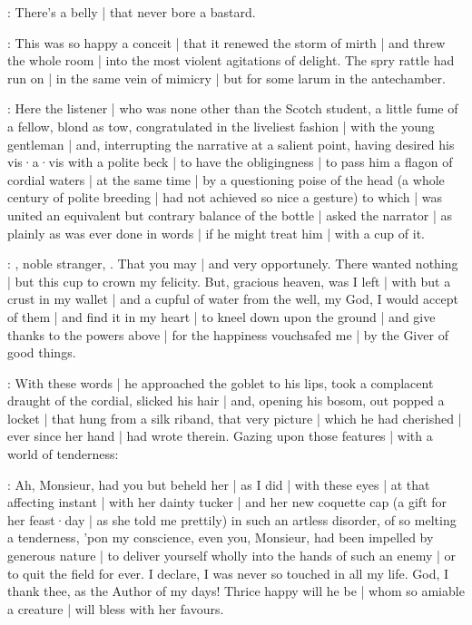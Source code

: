 \mulligan:
There's a belly |
that never bore a bastard.

:
This was so happy a conceit |
that it renewed the storm of mirth |
and threw the whole room |
into the most violent agitations of delight.
The spry rattle had run on |
in the same vein of mimicry |
but for some larum in the antechamber.

\pagebreak[4]


:
Here the listener |
who was none other than the Scotch student,
a little fume of a fellow,
blond as tow,
congratulated in the liveliest fashion |
with the young gentleman |
and,
interrupting the narrative at a salient point,
having desired his vis·a·vis with a polite beck |
to have the obligingness |
to pass him a flagon of cordial waters |
at the same time |
by a questioning poise of the head
(a whole century of polite breeding |
had not achieved so nice a gesture)
to which |
was united an equivalent but contrary balance of the bottle |
asked the narrator |
as plainly as was ever done in words |
if he might treat him |
with a cup of it.

\bannon:
,
noble stranger,
.
That you may |
and very opportunely.
There wanted nothing |
but this cup to crown my felicity.
But,
gracious heaven,
was I left |
with but a crust in my wallet |
and a cupful of water from the well,
my God,
I would accept of them |
and find it in my heart |
to kneel down upon the ground |
and give thanks to the powers above |
for the happiness vouchsafed me |
by the Giver of good things.

:
With these words |
he approached the goblet to his lips,
took a complacent draught of the cordial,
slicked his hair |
and,
opening his bosom,
out popped a locket |
that hung from a silk riband,
that very picture |
which he had cherished |
ever since her hand |
had wrote therein.
Gazing upon those features |
with a world of tenderness:

\bannon:
Ah,
Monsieur,
had you but beheld her |
as I did |
with these eyes |
at that affecting instant |
with her dainty tucker |
and her new coquette cap
(a gift for her feast·day |
as she told me prettily)
in such an artless disorder,
of so melting a tenderness,
'pon my conscience,
even you,
Monsieur,
had been impelled by generous nature |
to deliver yourself wholly into the hands of such an enemy |
or to quit the field for ever.
I declare,
I was never so touched in all my life.
God,
I thank thee,
as the Author of my days!
Thrice happy will he be |
whom so amiable a creature |
will bless with her favours.

